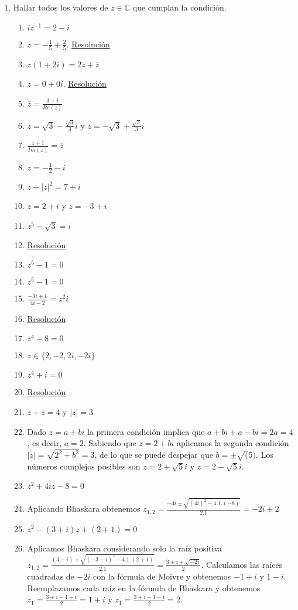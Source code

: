 \documentclass[a4paper]{article}
\newcommand{\answer}{\item[**]}
\newcommand{\exercise}{\item}
\newcommand{\df}[2]{\displaystyle\frac{#1}{#2}}
\newcommand{\conj}[1]{\overline{#1}}
\begin{document}
\begin{enumerate}
\begin{enumerate} [label=(\alph*)]
	\end{enumerate}

	\exercise Hallar todos los valores de $z \in \mathbb{C}$ que cumplan la condición.
	\begin{multicols}{2}
	\begin{enumerate} [label=(\alph*)]
		
		\item $iz^{-1}=2-i$
		\answer $z=-\df{1}{5}+\df{2}{5}$. \href{https://youtu.be/Yrh7otV4DzI}{Resolución}

		\item $z(1+2i)=2z+\conj{z}$
		\answer $z=0+0i$. \href{https://youtu.be/erb6iZXGQw4}{Resolución}

		\item $\conj{z}=\df{3+i}{Re(z)}$
		\answer $z=\sqrt{3}-\df{\sqrt{3}}{3}i$ y $z=-\sqrt{3}+\df{\sqrt{3}}{3}i$

		\item $\df{z+1}{Im(z)}=\conj{z}$
		\answer $z=-\df{1}{2}-i$

		\item $z+|z|^2=7+i$
		\answer $z=2+i$ y $z=-3+i$

		\item $z^5-\sqrt{3}=i$
		\answer \href{https://youtu.be/plpDsgzooH4}{Resolución}

		\item $z^5-1=0$
		\answer $z^5-1=0$

		\item $\df{-3i+1}{4i-2}=z^2i$
		\answer \href{https://youtu.be/8z_3vpIabLI}{Resolución}

		\item $z^4-8=0$
		\answer $z \in \{2,-2,2i,-2i\}$

		\item $z^4+i=0$
		\answer \href{https://youtu.be/7ggnxlrUnrk}{Resolución}

		\item $z+\conj{z}=4$ y $|z|=3$
		\answer Dado $z=a+bi$ la primera condición implica que $a+bi+a-bi=2a=4$, es decir, $a=2$. Sabiendo que $z=2+bi$ aplicamos la segunda condición $|z|=\sqrt{2^2+b^2}=3$, de lo que se puede despejar que $b=\pm\sqrt(5)$. Los números complejos posibles son $z=2+\sqrt{5}i$ y $z=2-\sqrt{5}i$.

		\item $z^2+4iz-8=0$
		\answer Aplicando Bhaskara obtenemos $z_{1,2}=\df{-4i\pm\sqrt{(4i)^2-4.1.(-8)}}{2.1}=-2i\pm2$

		\item $z^2-(3+i)z+(2+1)=0$
		\answer Aplicamos Bhaskara considerando solo la raíz positiva $z_{1,2}=\df{(3+i)+\sqrt{(-3-i)^2-4.1.(2+1)}}{2.1}=\df{3+i+\sqrt{-2i}}{2}$. Calculamos las raíces cuadradas de $-2i$ con la fórmula de Moivre y obtenemos $-1+i$ y $1-i$. Reemplazamos cada raíz en la fórmula de Bhaskara y obtenemos $z_1=\df{3+i-1+i}{2}=1+i$ y $z_1=\df{3+i+1-i}{2}=2$.


\end{enumerate}
\end{multicols}
\end{enumerate}
\end{document}
